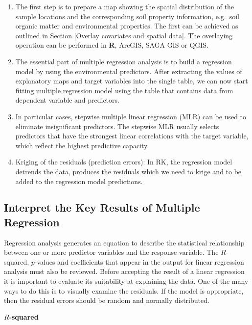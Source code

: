 \documentclass[10pt,b5paper,]{book}
\providecommand{\tightlist}{%
  \setlength{\itemsep}{0pt}\setlength{\parskip}{0pt}}
\theoremstyle{definition}
\theoremstyle{definition}
\theoremstyle{definition}
\theoremstyle{remark}
\begin{document}
\begin{enumerate}
\def\labelenumi{\arabic{enumi}.}
\tightlist
\item
  The first step is to prepare a map showing the spatial distribution of
  the sample locations and the corresponding soil property information,
  e.g.~soil organic matter and environmental properties. The first can
  be achieved as outlined in Section {[}Overlay covariates and spatial
  data{]}. The overlaying operation can be performed in \textbf{R},
  ArcGIS, SAGA GIS or QGIS.
\item
  The essential part of multiple regression analysis is to build a
  regression model by using the environmental predictors. After
  extracting the values of explanatory maps and target variables into
  the single table, we can now start fitting multiple regression model
  using the table that contains data from dependent variable and
  predictors.
\item
  In particular cases, stepwise multiple linear regression (MLR) can be
  used to eliminate insignificant predictors. The stepwise MLR usually
  selects predictors that have the strongest linear correlations with
  the target variable, which reflect the highest predictive capacity.
\item
  Kriging of the residuals (prediction errors): In RK, the regression
  model detrends the data, produces the residuals which we need to krige
  and to be added to the regression model predictions.
\end{enumerate}

\hypertarget{interpret-the-key-results-of-multiple-regression}{%
\subsection{Interpret the Key Results of Multiple
Regression}\label{interpret-the-key-results-of-multiple-regression}}

Regression analysis generates an equation to describe the statistical
relationship between one or more predictor variables and the response
variable. The \(R\)-squared, \(p\)-values and coefficients that appear
in the output for linear regression analysis must also be reviewed.
Before accepting the result of a linear regression it is important to
evaluate its suitability at explaining the data. One of the many ways to
do this is to visually examine the residuals. If the model is
appropriate, then the residual errors should be random and normally
distributed.

\textbf{\(R\)-squared}
\end{document}
